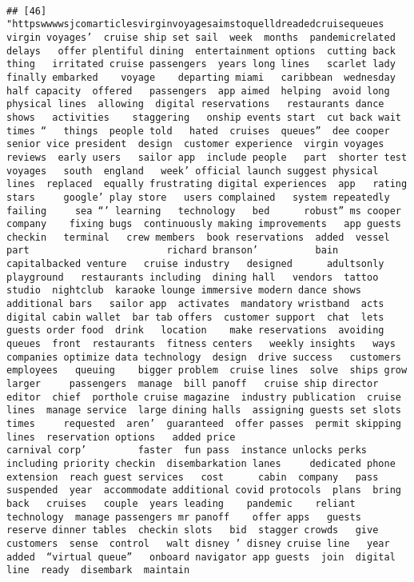 \documentclass[
]{article}
\begin{document}
\begin{verbatim}
                                                                                                                                                                                                                                                                                                                                                                                                                                                                                                  
## [46] "httpswwwwsjcomarticlesvirginvoyagesaimstoquelldreadedcruisequeues virgin voyages’  cruise ship set sail  week  months  pandemicrelated delays   offer plentiful dining  entertainment options  cutting back   thing   irritated cruise passengers  years long lines   scarlet lady finally embarked    voyage    departing miami   caribbean  wednesday  half capacity  offered   passengers  app aimed  helping  avoid long physical lines  allowing  digital reservations   restaurants dance shows   activities    staggering   onship events start  cut back wait times “   things  people told   hated  cruises  queues”  dee cooper senior vice president  design  customer experience  virgin voyages   reviews  early users   sailor app  include people   part  shorter test voyages   south  england   week’ official launch suggest physical lines  replaced  equally frustrating digital experiences  app   rating   stars     google’ play store   users complained   system repeatedly failing     sea “’ learning   technology   bed      robust” ms cooper   company    fixing bugs  continuously making improvements   app guests   checkin   terminal   crew members  book reservations  added  vessel part                        richard branson’          bain capitalbacked venture   cruise industry   designed      adultsonly playground   restaurants including  dining hall   vendors  tattoo studio  nightclub  karaoke lounge immersive modern dance shows   additional bars   sailor app  activates  mandatory wristband  acts   digital cabin wallet  bar tab offers  customer support  chat  lets guests order food  drink   location    make reservations  avoiding queues  front  restaurants  fitness centers   weekly insights   ways companies optimize data technology  design  drive success   customers  employees   queuing    bigger problem  cruise lines  solve  ships grow larger     passengers  manage  bill panoff   cruise ship director   editor  chief  porthole cruise magazine  industry publication  cruise lines  manage service  large dining halls  assigning guests set slots  times     requested  aren’  guaranteed  offer passes  permit skipping lines  reservation options   added price                       carnival corp’         faster  fun pass  instance unlocks perks including priority checkin  disembarkation lanes     dedicated phone extension  reach guest services   cost      cabin  company   pass  suspended  year  accommodate additional covid protocols  plans  bring  back   cruises   couple  years leading    pandemic    reliant  technology  manage passengers mr panoff    offer apps   guests  reserve dinner tables  checkin slots   bid  stagger crowds   give customers  sense  control   walt disney ’ disney cruise line   year added  “virtual queue”   onboard navigator app guests  join  digital line  ready  disembark  maintain 
\end{verbatim}
\end{document}
